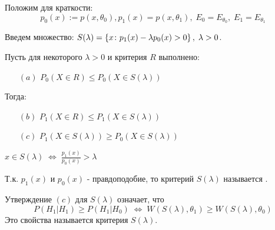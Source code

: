 Положим для краткости:
$$p_0 (x) := p(x, \theta_0), p_1(x) = p(x, \theta_1), \; E_0 = E_{\theta_0}, \; E_1 = E_{\theta_1}$$

Введем множество: $S(\lambda) = \left\{x\colon p_1(x) - \lambda p_0(x) > 0\right\}, \; \lambda > 0$.

\begin{theorem}\label{lec:4/the:1}
	Пусть для некоторого $\lambda > 0$ и критерия $R$ выполнено:
	\begin{itemize}
		\item[$(a)$] $P_0 (X \in R) \le P_0 (X \in S(\lambda))$
	\end{itemize}
	Тогда:
	\begin{itemize}
		\item[$(b)$] $P_1 (X \in R) \le P_1 (X \in S(\lambda))$
		\item[$(c)$] $P_1 (X \in S(\lambda)) \ge P_0 (X \in S(\lambda))$
	\end{itemize}
\end{theorem}

\begin{remark}\label{lec:4/remark:2}
	$x \in S(\lambda) \; \Leftrightarrow \; \frac{p_1 (x)}{p_0 (x)} > \lambda$
\end{remark}

\begin{definition}\label{lec:4/def:10}
	Т.к. $p_1(x)$ и $p_0(x)$ - правдоподобие, то критерий $S(\lambda)$ называется .
\end{definition}

\begin{remark}\label{lec:4/remark:3}
	Утверждение $(c)$ для $S(\lambda)$ означает, что
	$$P(H_1|H_1) \ge P(H_1|H_0) \; \Leftrightarrow \; W(S(\lambda), \theta_1) \ge W(S(\lambda), \theta_0)$$
	Это свойства называется  критерия $S(\lambda)$.
\end{remark}

